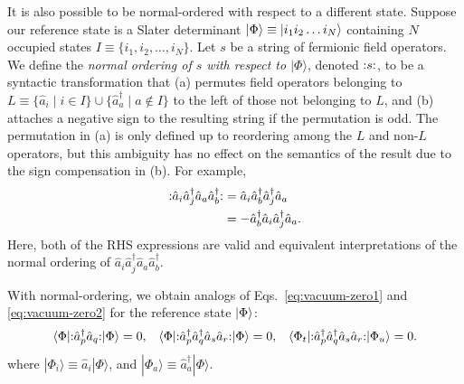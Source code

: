 It is also possible to be normal-ordered with respect to a different state.  Suppose our reference state is a Slater determinant $| \Phi \rangle \equiv | i_1 i_2 \ldots i_N \rangle$ containing $N$ occupied states $I \equiv \{i_1, i_2, \ldots, i_N\}$.  Let $s$ be a string of fermionic field operators.  We define the \textit{normal ordering of $s$ with respect to $|\Phi\rangle$}, denoted $\mathopen: s \mathclose:$, to be a syntactic transformation that (a) permutes field operators belonging to $L \equiv \{\hat{a}_i^{} \mid i \in I\} \cup \{\hat{a}_a^\dagger \mid a \notin I\}$ to the left of those not belonging to $L$, and (b) attaches a negative sign to the resulting string if the permutation is odd.  The permutation in (a) is only defined up to reordering among the $L$ and non-$L$ operators, but this ambiguity has no effect on the semantics of the result due to the sign compensation in (b).  For example,
\begin{align*}
  \mathopen: \hat{a}_i \hat{a}^\dagger_j \hat{a}_a \hat{a}_b^\dagger \mathclose:
  &= \hat{a}_i \hat{a}_b^\dagger \hat{a}^\dagger_j \hat{a}_a \\
  &= -\hat{a}_b^\dagger \hat{a}_i \hat{a}^\dagger_j \hat{a}_a.
\end{align*}
Here, both of the RHS expressions are valid and equivalent interpretations of the normal ordering  of $\hat{a}_i \hat{a}^\dagger_j \hat{a}_a \hat{a}_b^\dagger$.

With normal-ordering, we obtain analogs of Eqs.\ \eqref{eq:vacuum-zero1} and \eqref{eq:vacuum-zero2} for the reference state $| \Phi \rangle$:
\begin{align*}
&\langle \Phi | \mathopen: \hat{a}_p^\dagger \hat{a}_q \mathclose: | \Phi \rangle = 0, &
&\langle \Phi | \mathopen: \hat{a}_p^\dagger \hat{a}_q^\dagger \hat{a}_s \hat{a}_r \mathclose: | \Phi \rangle = 0,
&\langle \Phi_t | \mathopen: \hat{a}_p^\dagger \hat{a}_q^\dagger \hat{a}_s \hat{a}_r \mathclose: | \Phi_u \rangle = 0.
\end{align*}
where $|\Phi_i\rangle \equiv \hat{a}_i^{} |\Phi\rangle$, and $|\Phi_a\rangle \equiv \hat{a}_a^\dagger |\Phi\rangle$.

